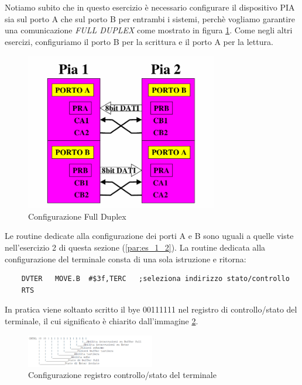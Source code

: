 Notiamo subito che in questo esercizio è necessario configurare il dispositivo PIA sia sul porto A che sul porto B per entrambi i sistemi, perchè vogliamo garantire una comunicazione \textit{FULL DUPLEX} come mostrato in figura \ref{img:PIA_FD}. Come negli altri esercizi, configuriamo il porto B per la scrittura e il porto A per la lettura. 

\begin{figure}[!ht]
    \centering
    \includegraphics[width=0.75\textwidth]{img/PIA_fd.png}
    \caption{Configurazione Full Duplex}\label{img:PIA_FD}
\end{figure}

Le routine dedicate alla configurazione dei porti A e B sono uguali a quelle viste nell'esercizio 2 di questa sezione (\ref{par:es_1_2}).
La routine dedicata alla configurazione del terminale consta di una sola istruzione e ritorna:

\begin{lstlisting}
    DVTER	MOVE.B	#$3f,TERC	;seleziona indirizzo stato/controllo
	RTS		
\end{lstlisting}

In pratica viene soltanto scritto il bye 00111111 nel registro di controllo/stato del terminale, il cui significato è chiarito dall'immagine \ref{img:terminal_cfg}.

\begin{figure}[!ht]
    \centering
    \includegraphics[width=0.5\textwidth]{img/terminal_ctrl.png}
    \caption{Configurazione registro controllo/stato del terminale}
    \label{img:terminal_cfg}
\end{figure}

